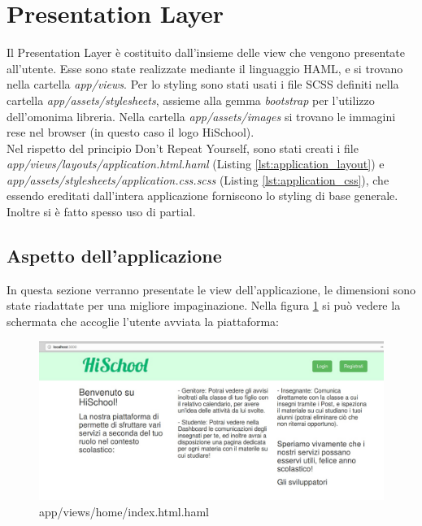 \documentclass[Lau, binding=0.6cm, oneside]{sapthesis}
\begin{document}
\section{Presentation Layer}

Il Presentation Layer è costituito dall'insieme delle view che vengono presentate all'utente. Esse sono state realizzate mediante il linguaggio HAML, e si trovano nella cartella \textit{app/views}. Per lo styling sono stati usati i file SCSS definiti nella cartella \textit{app/assets/stylesheets}, assieme alla gemma \textit{bootstrap} per l'utilizzo dell'omonima libreria. Nella cartella \textit{app/assets/images} si trovano le immagini rese nel browser (in questo caso il logo HiSchool).\\
Nel rispetto del principio Don't Repeat Yourself, sono stati creati i file \textit{app/views/layouts/application.html.haml} (Listing \ref{lst:application_layout}) e \textit{app/assets/stylesheets/application.css.scss} (Listing \ref{lst:application_css}), che essendo ereditati dall'intera applicazione forniscono lo styling di base generale.\\
Inoltre si è fatto spesso uso di partial.

\lstset{language=HAML, , captionpos=b, frame=single}


\lstset{language=CSS, , captionpos=b, frame=single}


\subsection{Aspetto dell'applicazione}
In questa sezione verranno presentate le view dell'applicazione, le dimensioni sono state riadattate per una migliore impaginazione. Nella figura \ref{fig:home_page} si può vedere la schermata che accoglie l'utente avviata la piattaforma:

\begin{figure}[H]
	\centering
	\includegraphics[width=1\linewidth]{images/home_page} 
	\caption{app/views/home/index.html.haml}
	\label{fig:home_page}
\end{figure}
\end{document}
